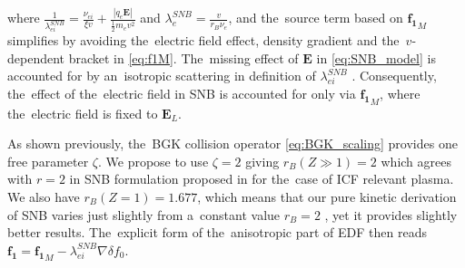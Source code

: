 \documentclass[
 aps,
 jmp,
 amsmath,amssymb,
 twocolumn,
]{revtex4-1}
\newcommand{\vect}[1]{\boldsymbol{#1}}
\newcommand{\mfpe}{\lambda_e}
\newcommand{\mfpei}{\lambda_{ei}}
\newcommand{\Zbar}{Z}
\newcommand{\nue}{\nu_{e}}
\newcommand{\nuei}{\nu_{ei}}
\newcommand{\vmag}{v}
\newcommand{\E}{\vect{E}}
\newcommand{\qe}{q_e}
\newcommand{\me}{m_e}
\newcommand{\fzero}{f_0}
\newcommand{\fone}{{\vect{f_1}}}
\begin{document}
where $\frac{1}{\mfpei^{SNB}} = 
\frac{\nuei}{\xi\vmag} + \frac{|\qe\E|}{\frac{1}{2}\me\vmag^2}$ 
and $\mfpe^{SNB} = \frac{\vmag}{r_B \nue}$, and the~source term based on 
$\fone_M$ simplifies by avoiding the~electric field effect, density gradient 
and the~$\vmag$-dependent bracket in \eqref{eq:f1M}. The~missing
effect of $\E$ in \eqref{eq:SNB_model} is accounted for by 
an~isotropic scattering in definition of $\mfpei^{SNB}$ \cite{Schurtz_2000}.
Consequently, the~effect of the~electric field in SNB
is accounted for only via $\fone_M$, where the~electric field is
fixed to $\E_L$. 

As shown previously, the~BGK collision operator \eqref{eq:BGK_scaling}
provides one free parameter $\zeta$.
We propose to use $\zeta = 2$ giving $r_B(\Zbar\gg1) = 2$ which agrees 
with $r=2$ in SNB formulation proposed in \cite{Brodrick_PoP2017} 
for the~case of ICF relevant plasma. We also have $r_B(\Zbar = 1) = 1.677$,
which means that our pure kinetic derivation of SNB varies just slightly
from a~constant value $r_B=2$ \cite{Brodrick_PoP2017}, yet it provides 
slightly better results. The~explicit form of the~anisotropic 
part of EDF then reads $\fone = \fone_M - \mfpei^{SNB}\nabla\delta\fzero$.
\end{document}
